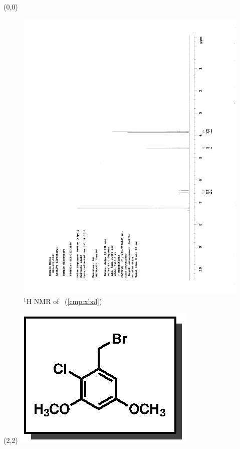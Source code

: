 \begin{textblock}{20}(0,0)
\begin{figure}[htb]
\caption{$^1$H NMR of \CMPxbal\ (\ref{cmp:xbal})}
\includegraphics[scale=0.75, trim = 0mm 0mm 0mm 5mm,
clip]{chp_singlecarbon/images/nmr/xbalH}
\vspace{-100pt}
\end{figure}
\end{textblock}
\begin{textblock}{1}(2,2)
\includegraphics[scale=0.8, angle=90]{chp_singlecarbon/images/xbal}
\end{textblock}
